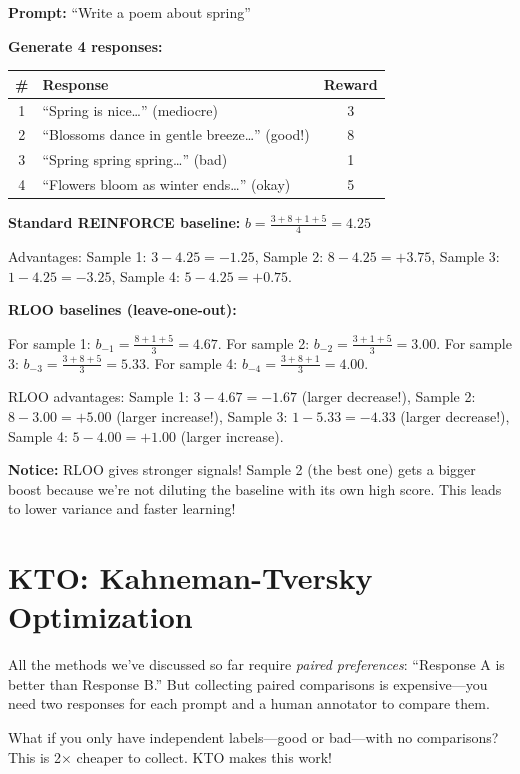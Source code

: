 \begin{chapterenv}
\textbf{Prompt:} ``Write a poem about spring''

\textbf{Generate 4 responses:}

\begin{center}
\begin{tabular}{clc}
\toprule
\textbf{\#} & \textbf{Response} & \textbf{Reward} \\
\midrule
1 & ``Spring is nice\ldots'' (mediocre) & 3 \\
2 & ``Blossoms dance in gentle breeze\ldots'' (good!) & 8 \\
3 & ``Spring spring spring\ldots'' (bad) & 1 \\
4 & ``Flowers bloom as winter ends\ldots'' (okay) & 5 \\
\bottomrule
\end{tabular}
\end{center}

\textbf{Standard REINFORCE baseline:} $b = \frac{3 + 8 + 1 + 5}{4} = 4.25$

Advantages: Sample 1: $3 - 4.25 = -1.25$, Sample 2: $8 - 4.25 = +3.75$, Sample 3: $1 - 4.25 = -3.25$, Sample 4: $5 - 4.25 = +0.75$.

\textbf{RLOO baselines (leave-one-out):}

For sample 1: $b_{-1} = \frac{8 + 1 + 5}{3} = 4.67$. For sample 2: $b_{-2} = \frac{3 + 1 + 5}{3} = 3.00$. For sample 3: $b_{-3} = \frac{3 + 8 + 5}{3} = 5.33$. For sample 4: $b_{-4} = \frac{3 + 8 + 1}{3} = 4.00$.

RLOO advantages: Sample 1: $3 - 4.67 = -1.67$ (larger decrease!), Sample 2: $8 - 3.00 = +5.00$ (larger increase!), Sample 3: $1 - 5.33 = -4.33$ (larger decrease!), Sample 4: $5 - 4.00 = +1.00$ (larger increase).

\textbf{Notice:} RLOO gives stronger signals! Sample 2 (the best one) gets a bigger boost because we're not diluting the baseline with its own high score. This leads to lower variance and faster learning!

\section{KTO: Kahneman-Tversky Optimization}

All the methods we've discussed so far require \textit{paired preferences}: ``Response A is better than Response B.'' But collecting paired comparisons is expensive---you need two responses for each prompt and a human annotator to compare them.

What if you only have independent labels---good or bad---with no comparisons? This is 2$\times$ cheaper to collect. KTO makes this work!


\end{chapterenv}
